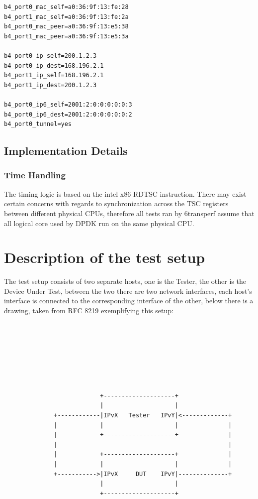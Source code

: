 \documentclass[a4paper,12p]{article}
\begin{document}
\begin{lstlisting}
b4_port0_mac_self=a0:36:9f:13:fe:28
b4_port1_mac_self=a0:36:9f:13:fe:2a
b4_port0_mac_peer=a0:36:9f:13:e5:38
b4_port1_mac_peer=a0:36:9f:13:e5:3a

b4_port0_ip_self=200.1.2.3
b4_port0_ip_dest=168.196.2.1
b4_port1_ip_self=168.196.2.1
b4_port1_ip_dest=200.1.2.3

b4_port0_ip6_self=2001:2:0:0:0:0:0:3
b4_port0_ip6_dest=2001:2:0:0:0:0:0:2
b4_port0_tunnel=yes
\end{lstlisting}

\subsection{Implementation Details}
\subsubsection{Time Handling}

The timing logic is based on the intel x86 RDTSC instruction. There may exist certain concerns with regards to synchronization across the TSC  registers between different physical CPUs, therefore all tests ran by 6transperf assume that all logical core used by DPDK run on the same physical CPU.

\section{Description of the test setup}
The test setup consists of two separate hosts, one is the Tester, the other is the Device Under Test, between the two there are two network interfaces, each host’s interface is connected to the corresponding interface of the other, below there is a drawing, taken from RFC 8219 exemplifying this setup:

\begin{lstlisting}[basicstyle=\tiny]







                           +--------------------+
                           |                    |
              +------------|IPvX   Tester   IPvY|<-------------+
              |            |                    |              |
              |            +--------------------+              |
              |                                                |
              |            +--------------------+              |
              |            |                    |              |
              +----------->|IPvX     DUT    IPvY|--------------+
                           |                    |
                           +--------------------+

\end{lstlisting}
\end{document}
